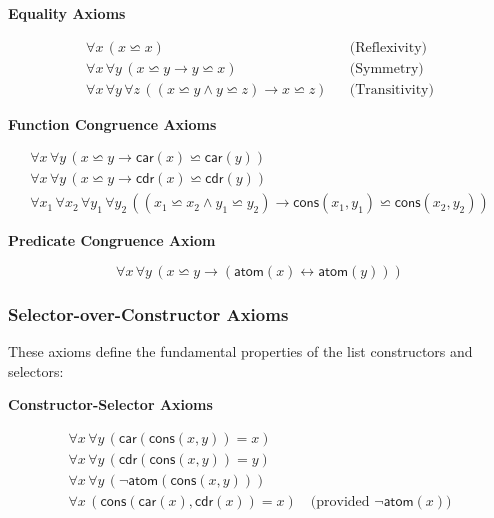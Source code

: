 \documentclass[11pt,a4paper]{article}
\theoremstyle{definition}
\theoremstyle{plain}
\theoremstyle{remark}
\begin{document}
\begin{center}
\textbf{Equality Axioms}
\end{center}

\begin{align*}
\forall x \, (x \backsimeq x) && \text{(Reflexivity)} \\
\forall x \, \forall y \, (x \backsimeq y \rightarrow y \backsimeq x) && \text{(Symmetry)} \\
\forall x \, \forall y \, \forall z \, ((x \backsimeq y \wedge y \backsimeq z) \rightarrow x \backsimeq z) && \text{(Transitivity)}
\end{align*}

\begin{center}
\textbf{Function Congruence Axioms}
\end{center}

\begin{align*}
\forall x \, \forall y \, (x \backsimeq y \rightarrow \textsf{car}(x) \backsimeq \textsf{car}(y)) \\
\forall x \, \forall y \, (x \backsimeq y \rightarrow \textsf{cdr}(x) \backsimeq \textsf{cdr}(y)) \\
\forall x_1 \, \forall x_2 \, \forall y_1 \, \forall y_2 \, ((x_1 \backsimeq x_2 \wedge y_1 \backsimeq y_2) \rightarrow \textsf{cons}(x_1, y_1) \backsimeq \textsf{cons}(x_2, y_2))
\end{align*}

\begin{center}
\textbf{Predicate Congruence Axiom}
\end{center}

\[
\forall x \, \forall y \, (x \backsimeq y \rightarrow (\textsf{atom}(x) \leftrightarrow \textsf{atom}(y)))
\]

\subsubsection{Selector-over-Constructor Axioms}

These axioms define the fundamental properties of the list constructors and selectors:

\begin{center}
\textbf{Constructor-Selector Axioms}
\end{center}

\begin{align*}
\forall x \, \forall y \, (\textsf{car}(\textsf{cons}(x, y)) = x) \\
\forall x \, \forall y \, (\textsf{cdr}(\textsf{cons}(x, y)) = y) \\
\forall x \, \forall y \, (\neg \textsf{atom}(\textsf{cons}(x, y))) \\
\forall x \, (\textsf{cons}(\textsf{car}(x), \textsf{cdr}(x)) = x) \quad \text{(provided } \neg \textsf{atom}(x)\text{)}
\end{align*}
\end{document}
